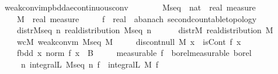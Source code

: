 \documentclass{article}
\theoremstyle{definition}
\begin{document}
\begin{isabellebody}
\isamarkupfalse%
\ weak{\isacharunderscore}conv{\isacharunderscore}imp{\isacharunderscore}bdd{\isacharunderscore}ae{\isacharunderscore}continuous{\isacharunderscore}conv{\isacharcolon}\isanewline
\ \ \ \isanewline
\ \ \ \ M{\isacharunderscore}seq\ {\isacharcolon}{\isacharcolon}\ {\isachardoublequoteopen}nat\ {\isasymRightarrow}\ real\ measure{\isachardoublequoteclose}\ \isanewline
\ \ \ \ M\ {\isacharcolon}{\isacharcolon}\ {\isachardoublequoteopen}real\ measure{\isachardoublequoteclose}\ \isanewline
\ \ \ \ f\ {\isacharcolon}{\isacharcolon}\ {\isachardoublequoteopen}real\ {\isasymRightarrow}\ {\isacharprime}a{\isacharcolon}{\isacharcolon}{\isacharbraceleft}banach{\isacharcomma}\ second{\isacharunderscore}countable{\isacharunderscore}topology{\isacharbraceright}{\isachardoublequoteclose}\isanewline
\ \ \ \isanewline
\ \ \ \ distr{\isacharunderscore}M{\isacharunderscore}seq{\isacharcolon}\ {\isachardoublequoteopen}{\isasymAnd}n{\isachardot}\ real{\isacharunderscore}distribution\ {\isacharparenleft}M{\isacharunderscore}seq\ n{\isacharparenright}{\isachardoublequoteclose}\ \ \isanewline
\ \ \ \ distr{\isacharunderscore}M{\isacharcolon}\ {\isachardoublequoteopen}real{\isacharunderscore}distribution\ M{\isachardoublequoteclose}\ \ \isanewline
\ \ \ \ wcM{\isacharcolon}\ {\isachardoublequoteopen}weak{\isacharunderscore}conv{\isacharunderscore}m\ M{\isacharunderscore}seq\ M{\isachardoublequoteclose}\ \isanewline
\ \ \ \ discont{\isacharunderscore}null{\isacharcolon}\ {\isachardoublequoteopen}M\ {\isacharparenleft}{\isacharbraceleft}x{\isachardot}\ {\isasymnot}\ isCont\ f\ x{\isacharbraceright}{\isacharparenright}\ {\isacharequal}\ {}{\isachardoublequoteclose}\ \isanewline
\ \ \ \ f{\isacharunderscore}bdd{\isacharcolon}\ {\isachardoublequoteopen}{\isasymAnd}x{\isachardot}\ norm\ {\isacharparenleft}f\ x{\isacharparenright}\ {\isasymle}\ B{\isachardoublequoteclose}\ \isanewline
\ \ \ \ {\isacharbrackleft}measurable{\isacharbrackright}{\isacharcolon}\ {\isachardoublequoteopen}f\ {\isasymin}\ borel{\isacharunderscore}measurable\ borel{\isachardoublequoteclose}\isanewline
\ \ \ \isanewline
\ \ \ \ {\isachardoublequoteopen}{\isacharparenleft}{\isasymlambda}\ n{\isachardot}\ integral\isactrlsup L\ {\isacharparenleft}M{\isacharunderscore}seq\ n{\isacharparenright}\ f{\isacharparenright}\ {\isacharminus}{\isacharminus}{\isacharminus}{\isacharminus}{\isachargreater}\ integral\isactrlsup L\ M\ f{\isachardoublequoteclose}
\end{isabellebody}
\end{document}

